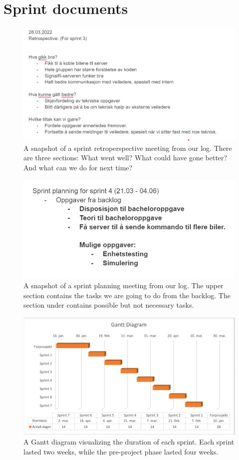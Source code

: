 \chapter{Sprint documents}

\begin{figure}[h!]
	\centering
	\includegraphics[width=1\linewidth]{figures/sprint_retroperspective}
	\caption[Sprint retroperspective]{A snapshot of a sprint retroperspective meeting from our log. There are three sections: What went well? What could have gone better? And what can we do for next time?}
	\label{fig:sprintretroperspective}
\end{figure}

\begin{figure}[h!]
	\centering
	\includegraphics[width=1\linewidth]{figures/sprint_planning}
	\caption[Sprint planning]{A snapshot of a sprint planning meeting from our log. The upper section contains the tasks we are going to do from the backlog. The section under contains possible but not necessary tasks.}
	\label{fig:sprintplanning}
\end{figure}

\begin{figure}[h!]
	\centering
	\includegraphics[width=1\linewidth]{figures/gantt}
	\caption[Sprint planning]{A Gantt diagram visualizing the duration of each sprint. Each sprint lasted two weeks, while the pre-project phase lasted four weeks.}
	\label{fig:gantt}
\end{figure}